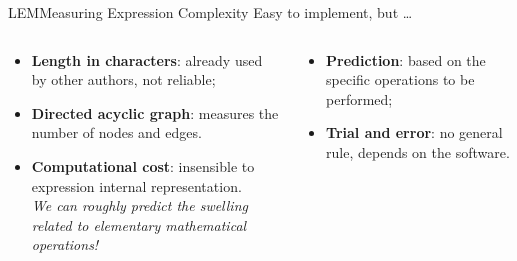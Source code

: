 \begin{frame}{\acl{LEM}}{Measuring Expression Complexity}
  Easy to implement, but \dots
  \vspace{1.5em}
  \begin{columns}
    \begin{column}[t]{0.5\textwidth}
      \begin{itemize}
        \normalsize
        \item \textbf{Length in characters}: already used by other authors, not reliable;
        \item \textbf{Directed acyclic graph}: measures the number of nodes and edges.
        \item \textbf{Computational cost}: insensible to expression internal representation. \\[0.25em]
        \emph{We can roughly predict the swelling related to elementary mathematical operations!}
      \end{itemize}
    \end{column}
    \begin{column}[t]{0.5\textwidth}
      \begin{itemize}
        \normalsize
        \item \textbf{Prediction}: based on the specific operations to be performed;
        \item \textbf{Trial and error}: no general rule, depends on the software.
      \end{itemize}
    \end{column}
  \end{columns}
\end{frame}

